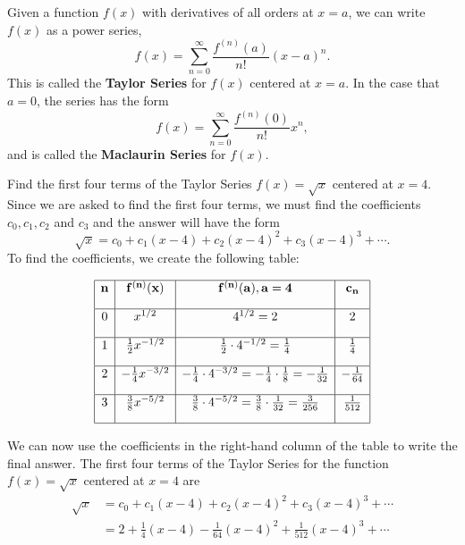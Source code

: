 \documentclass{ximera}
\begin{document}
\begin{theorem}
Given a function $f(x)$ with derivatives of all orders at $x = a$, we can write $f(x)$ as a power series,
\[
f(x) = \sum_{n=0}^\infty \frac{f^{(n)}(a)}{n!} (x-a)^n.
\]
This is called the \textbf{Taylor Series} for $f(x)$ centered at $x = a$. In the case that $a = 0$, the series has the form
\[
 f(x) = \sum_{n=0}^\infty \frac{f^{(n)}(0)}{n!} x^n,
\]
and is called the \textbf{Maclaurin Series} for $f(x)$.
\end{theorem}

\begin{example} Find the first four terms of the Taylor Series $f(x) = \sqrt x$ centered at $x = 4$.\\
Since we are asked to find the first four terms, we must find the coefficients $c _0, c_1, c_2$ and $c_3$
and the answer will have the form 
\[
\sqrt x = c_0 + c_1(x-4) + c_2(x-4)^2 + c_3(x-4)^3 + \cdots .
\]
To find the coefficients, we create the following table:

\[
\begin{array}{|c|c|c|c|} 
\hline
\bf{n} & \bf{f^{(n)}(x)} & \bf{f^{(n)}(a), a = 4} & \bf{c_n} \\[1em] 
\hline
 0 & x^{1/2} & 4^{1/2} = 2 & 2 \\[1em]
\hline
1 & \frac12 x^{-1/2} & \frac12 \cdot 4^{-1/2} = \frac14 & \frac14 \\[1em]
\hline
 2 & -\frac14 x^{-3/2} & -\frac14 \cdot 4^{-3/2} 
= -\frac14 \cdot \frac18 = -\frac{1}{32} & -\frac{1}{64} \\[1em]
\hline
 3 & \frac38 x^{-5/2} & \frac38 \cdot 4^{-5/2} = \frac38 \cdot \frac{1}{32} = \frac{3}{256} & \frac{1}{512}\\[1em]
\hline
\end{array}
\]



We can now use the coefficients in the right-hand column of the table to write the final answer. 
The first four terms of the Taylor Series for the function $f(x) = \sqrt x$ centered at $x = 4$ are
\begin{align*}
\sqrt x &= c_0 + c_1(x-4) + c_2(x-4)^2 + c_3(x-4)^3 + \cdots \\
        &= 2 + \frac14(x-4) -\frac{1}{64}(x-4)^2 + \frac{1}{512}(x-4)^3 + \cdots
\end{align*}

\end{example}
\end{document}
